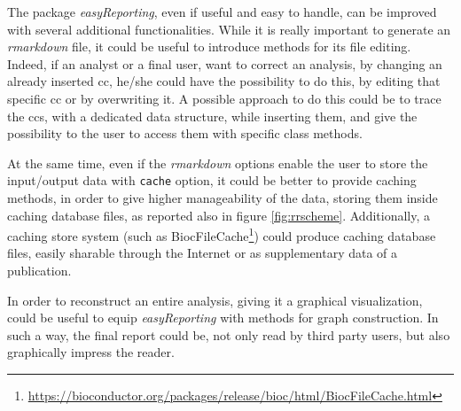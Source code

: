 The package \textit{easyReporting}, even if useful and easy to handle, can be improved with several additional functionalities.
While it is really important to generate an \textit{rmarkdown} file, it could be useful to introduce methods for its file editing. 
Indeed, if an analyst or a final user, want to correct an analysis, by changing an already inserted \gls{cc}, he/she could have the possibility to do this, by editing that specific \gls{cc} or by overwriting it.
A possible approach to do this could be to trace the \glspl{cc}, with a dedicated data structure, while inserting them, and give the possibility to the user to access them with specific class methods.

At the same time, even if the \textit{rmarkdown} options enable the user to store the input/output data with \lstinline!cache! option, it could be better to provide caching methods, in order to give higher manageability of the data, storing them inside caching database files, as reported also in figure \ref{fig:rrscheme}.
Additionally, a caching store system (such as BiocFileCache\footnote{\url{https://bioconductor.org/packages/release/bioc/html/BiocFileCache.html}}) could produce caching database files, easily sharable through the Internet or as supplementary data of a publication.

In order to reconstruct an entire analysis, giving it a graphical visualization, could be useful to equip \textit{easyReporting} with methods for graph construction.
In such a way, the final report could be, not only read by third party users, but also graphically impress the reader.



